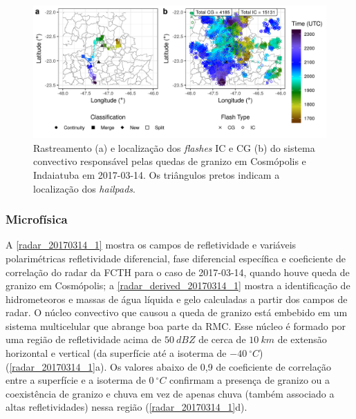 \begin{figure}[htb]
	\begin{center}
		\caption{Rastreamento (a) e localização dos \textit{flashes} IC e CG (b) do sistema convectivo responsável pelas quedas de granizo em Cosmópolis e Indaiatuba em 2017-03-14. Os triângulos pretos indicam a localização dos \textit{hailpads}.} 
		\label{track_flashes_20170314}
		\includegraphics[width=\columnwidth]{../General_Processing/figures/track_flashes_20170314.png}
	\end{center}
\end{figure}

\subsubsection{Microfísica}\label{micro_201703014}

A \autoref{radar_20170314_1} mostra os campos de refletividade e variáveis polarimétricas refletividade diferencial, fase diferencial específica e coeficiente de correlação do radar da FCTH para o caso de 2017-03-14, quando houve queda de granizo em Cosmópolis; a \autoref{radar_derived_20170314_1} mostra a identificação de hidrometeoros e massas de água líquida e gelo calculadas a partir dos campos de radar. O núcleo convectivo que causou a queda de granizo está embebido em um sistema multicelular que abrange boa parte da RMC. Esse núcleo é formado por uma região de refletividade acima de $50\:dBZ$ de cerca de $10\:km$ de extensão horizontal e vertical (da superfície até a isoterma de $-40\:^{\circ}C$) (\autoref{radar_20170314_1}a). Os valores abaixo de 0,9 de coeficiente de correlação entre a superfície e a isoterma de $0\:^{\circ}C$ confirmam a presença de granizo ou a coexistência de granizo e chuva em vez de apenas chuva (também associado a altas refletividades) nessa região (\autoref{radar_20170314_1}d).

